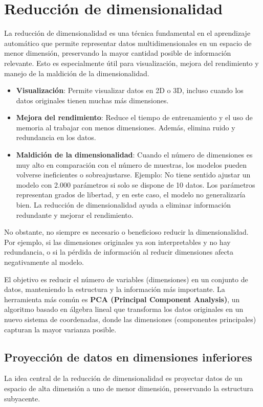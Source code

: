 \section{Reducción de dimensionalidad}
La reducción de dimensionalidad es una técnica fundamental en el aprendizaje automático que permite representar datos multidimensionales en un espacio de menor dimensión, preservando la mayor cantidad posible de información relevante. Esto es especialmente útil para visualización, mejora del rendimiento y manejo de la maldición de la dimensionalidad. 
\begin{itemize}
\item \textbf{Visualización}: Permite visualizar datos en 2D o 3D, incluso cuando los datos originales tienen muchas más dimensiones.
\item \textbf{Mejora del rendimiento}: Reduce el tiempo de entrenamiento y el uso de memoria al trabajar con menos dimensiones. Además, elimina ruido y redundancia en los datos.
\item \textbf{Maldición de la dimensionalidad}: Cuando el número de dimensiones es muy alto en comparación con el número de muestras, los modelos pueden volverse ineficientes o sobreajustarse.
Ejemplo: No tiene sentido ajustar un modelo con 2.000 parámetros si solo se dispone de 10 datos. Los parámetros representan grados de libertad, y en este caso, el modelo no generalizaría bien. La reducción de dimensionalidad ayuda a eliminar información redundante y mejorar el rendimiento.
\end{itemize}

No obstante, no siempre es necesario o beneficioso reducir la dimensionalidad. Por ejemplo, si las dimensiones originales ya son interpretables y no hay redundancia, o si la pérdida de información al reducir dimensiones afecta negativamente al modelo.

El objetivo es reducir el número de variables (dimensiones) en un conjunto de datos, manteniendo la estructura y la información más importante. La herramienta más común es \textbf{PCA (Principal Component Analysis)}, un algoritmo basado en álgebra lineal que transforma los datos originales en un nuevo sistema de coordenadas, donde las dimensiones (componentes principales) capturan la mayor varianza posible.

\subsection{Proyección de datos en dimensiones inferiores}
La idea central de la reducción de dimensionalidad es proyectar datos de un espacio de alta dimensión a uno de menor dimensión, preservando la estructura subyacente.

